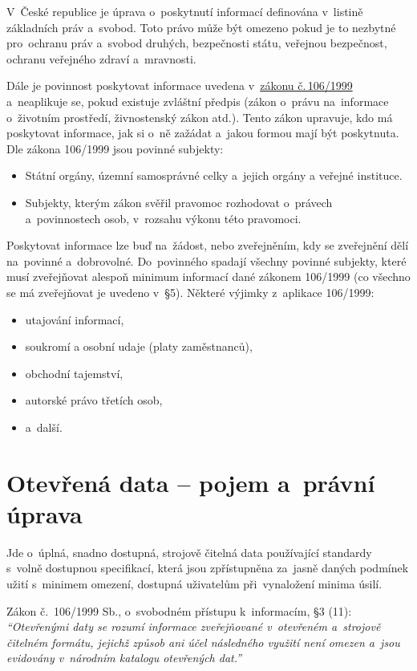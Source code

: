 V~České republice je úprava o~poskytnutí informací definována v~listině základních práv a~svobod. Toto právo může být omezeno pokud je to nezbytné pro~ochranu práv a~svobod druhých, bezpečnosti státu, veřejnou bezpečnost, ochranu veřejného zdraví a~mravnosti.

Dále je povinnost poskytovat informace uvedena v~\href{https://www.zakonyprolidi.cz/cs/1999-106}{zákonu č.\,106/1999} a~neaplikuje se, pokud existuje zvláštní předpis (zákon o~právu na~informace o~životním prostředí, živnostenský zákon atd.). Tento zákon upravuje, kdo má poskytovat informace, jak si o~ně zažádat a~jakou formou mají být poskytnuta. Dle zákona 106/1999 jsou povinné subjekty:

\begin{itemize}
    \item Státní orgány, územní samosprávné celky a~jejich orgány a veřejné instituce.
    \item Subjekty, kterým zákon svěřil pravomoc rozhodovat o~právech a~povinnostech osob, v~rozsahu výkonu této pravomoci.
\end{itemize}

Poskytovat informace lze buď na~žádost, nebo zveřejněním, kdy se zveřejnění dělí na~povinné a~dobrovolné. Do~povinného spadají všechny povinné subjekty, které musí zveřejňovat alespoň minimum informací dané zákonem 106/1999 (co všechno se má zveřejňovat je uvedeno v~§5). Některé výjimky z~aplikace 106/1999:

\begin{itemize}
    \item utajování informací,
    \item soukromí a osobní udaje (platy zaměstnanců),
    \item obchodní tajemství,
    \item autorské právo třetích osob,
    \item a~další.
\end{itemize}

\clearpage
\section{Otevřená data -- pojem a~právní úprava}

Jde o~úplná, snadno dostupná, strojově čitelná data používající standardy s~volně dostupnou specifikací, která jsou zpřístupněna za~jasně daných podmínek užití s~minimem omezení, dostupná uživatelům při~vynaložení minima úsilí.

Zákon č.~106/1999 Sb., o~svobodném přístupu k~informacím, §3 (11): \emph{\enquote{Otevřenými daty se rozumí informace zveřejňované v~otevřeném a~strojově čitelném formátu, jejichž způsob ani účel následného využití není omezen a~jsou evidovány v~národním katalogu otevřených dat.}}

